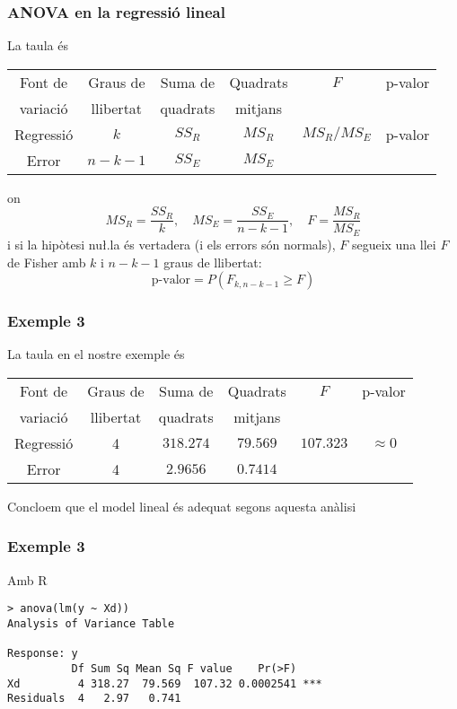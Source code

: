 \documentclass[12pt,t]{beamer}
\renewcommand{\geq}{\geqslant}
\theoremstyle{plain}
\theoremstyle{definition}
\begin{document}
\begin{frame}
\frametitle{ANOVA en la  regressió lineal}
La taula és
\begin{center}
\footnotesize \hspace*{-2ex}\begin{tabular}{|c|c|c|c|c|c|}\hline
Font de & Graus de & Suma de & Quadrats & $F$ & p-valor\\
variació & llibertat &  quadrats & mitjans      &  & \\\hline
Regressió & $k$ & $SS_R$  & $MS_R$ & $MS_R/MS_E$ &  p-valor\\
Error & $n\!-\!k\!-\!1$ & $SS_E$  & $MS_E$ & &\\
\hline 
\end{tabular}
\end{center}
on
$$
MS_R=\frac{SS_R}{k},\quad MS_E=\frac{SS_E}{n-k-1},\quad F=\frac{MS_R}{MS_E}
$$
i si la hipòtesi nu\l.la és vertadera (i els errors són normals), $F$ segueix una llei $F$ de Fisher amb $k$ i $n-k-1$ graus de llibertat:
$$
\mbox{p-valor}=P(F_{k,n-k-1}\geq F)
$$
\end{frame}


\begin{frame}
\frametitle{Exemple 3}
La taula en el nostre exemple és


\begin{center}
\footnotesize \begin{tabular}{|c|c|c|c|c|c|}\hline
Font de & Graus de & Suma de & Quadrats & $F$ & p-valor\\
variació & llibertat &  quadrats & mitjans      &  & \\\hline
Regressió & 4 & $318.274$  & $79.569$ & $107.323$ &  $\approx 0$\\
Error & 4 & $2.9656$  & $0.7414$ & &\\
\hline 
\end{tabular}
\end{center}
Concloem que el model lineal és adequat segons aquesta anàlisi
\end{frame}

\begin{frame}[fragile]
\frametitle{Exemple 3}

Amb R

{\small
\begin{verbatim}
> anova(lm(y ~ Xd))
Analysis of Variance Table

Response: y
          Df Sum Sq Mean Sq F value    Pr(>F)    
Xd         4 318.27  79.569  107.32 0.0002541 ***
Residuals  4   2.97   0.741                      
\end{verbatim}
}

\end{frame}
\end{document}

